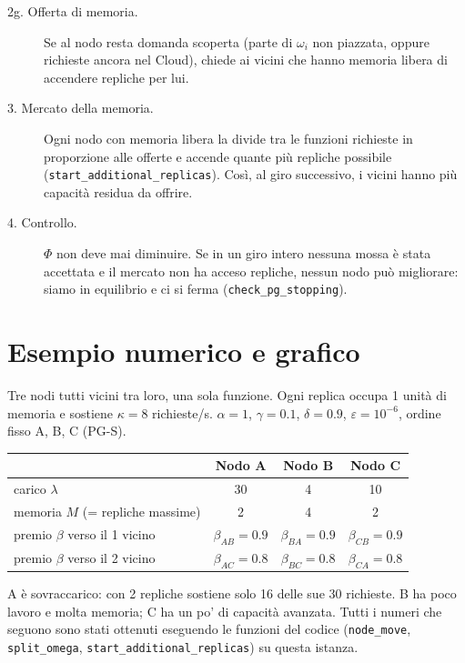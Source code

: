 \documentclass[11pt,a4paper]{article}
\newcommand{\Phiv}{\Phi}
\newcommand{\code}[1]{\texttt{#1}}
\begin{document}
\begin{description}
\item[2g. Offerta di memoria.] Se al nodo resta domanda scoperta (parte di
  $\omega_i$ non piazzata, oppure richieste ancora nel Cloud), chiede ai vicini
  che hanno memoria libera di accendere repliche per lui.

\item[3. Mercato della memoria.] Ogni nodo con memoria libera la divide tra
  le funzioni richieste in proporzione alle offerte e accende quante pi\`u
  repliche possibile (\code{start\_additional\_replicas}). Cos\`i, al giro
  successivo, i vicini hanno pi\`u capacit\`a residua da offrire.

\item[4. Controllo.] $\Phiv$ non deve mai diminuire. Se in un giro intero
  nessuna mossa \`e stata accettata e il mercato non ha acceso repliche,
  nessun nodo pu\`o migliorare: siamo in equilibrio e ci si ferma
  (\code{check\_pg\_stopping}).
\end{description}

\section{Esempio numerico e grafico}

Tre nodi tutti vicini tra loro, una sola funzione. Ogni replica occupa 1 unit\`a
di memoria e sostiene $\kappa = 8$ richieste/s. $\alpha = 1$, $\gamma = 0.1$,
$\delta = 0.9$, $\varepsilon = 10^{-6}$, ordine fisso A, B, C (PG-S).

\begin{center}
\begin{tabular}{@{}lccc@{}}
\toprule
 & Nodo A & Nodo B & Nodo C \\
\midrule
carico $\lambda$ & 30 & 4 & 10 \\
memoria $M$ (= repliche massime) & 2 & 4 & 2 \\
premio $\beta$ verso il 1\textordmasculine{} vicino & $\beta_{AB}=0.9$ & $\beta_{BA}=0.9$ & $\beta_{CB}=0.9$ \\
premio $\beta$ verso il 2\textordmasculine{} vicino & $\beta_{AC}=0.8$ & $\beta_{BC}=0.8$ & $\beta_{CA}=0.8$ \\
\bottomrule
\end{tabular}
\end{center}

A \`e sovraccarico: con 2 repliche sostiene solo 16 delle sue 30 richieste.
B ha poco lavoro e molta memoria; C ha un po' di capacit\`a avanzata.
Tutti i numeri che seguono sono stati ottenuti eseguendo le funzioni del
codice (\code{node\_move}, \code{split\_omega}, \code{start\_additional\_replicas})
su questa istanza.
\end{document}
